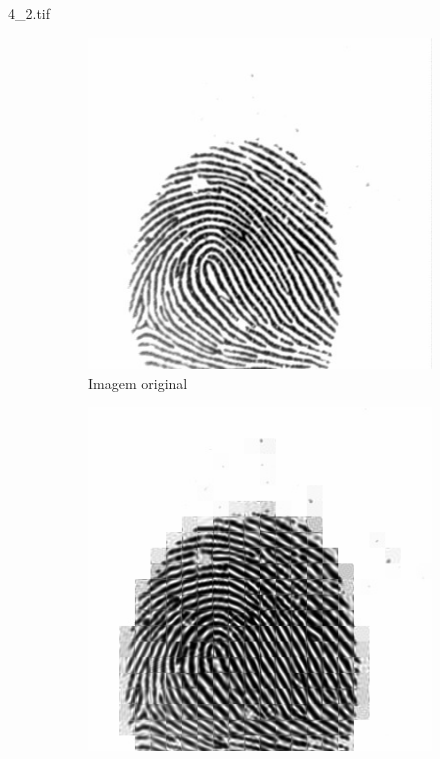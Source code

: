 \documentclass{beamer}
\begin{document}
    \begin{frame}{4\_2.tif}
        \begin{figure}
            \centering
            \begin{subfigure}[!ht]{0.32\textwidth}
                \includegraphics[width=\columnwidth]{Fingerprints/4_2.jpg}
                \caption{Imagem original}
            \end{subfigure}
            \begin{subfigure}[!ht]{0.32\textwidth}
                \includegraphics[width=\columnwidth]{Fingerprints/4_2_intermediate.jpg}

\end{subfigure}
\end{figure}
\end{frame}
\end{document}
